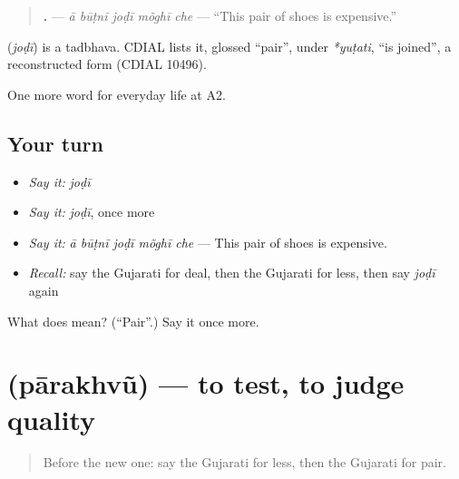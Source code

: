 \begin{quote}
\textbf{    .} — \emph{ā būṭnī joḍī mõghī che} — \textquotedblleft{}This pair of shoes is expensive.\textquotedblright{}
\end{quote}

\begin{cousinweb}
\textbf{} (\emph{joḍī}) is a tadbhava. CDIAL lists it, glossed \textquotedblleft{}pair\textquotedblright{}, under \emph{*yuṭati}, \textquotedblleft{}is joined\textquotedblright{}, a reconstructed form (CDIAL 10496).
\end{cousinweb}

\begin{grammarlens}[title={What you've built}]
One more word for everyday life at A2.
\end{grammarlens}

\subsection*{Your turn}
\begin{itemize}
\raggedright
  \item \emph{Say it:} \emph{joḍī}
  \item \emph{Say it:} \emph{joḍī}, once more
  \item \emph{Say it:} \emph{ā būṭnī joḍī mõghī che} — This pair of shoes is expensive.
  \item \emph{Recall:} say the Gujarati for deal, then the Gujarati for less, then say \emph{joḍī} again
\end{itemize}

\begin{tcolorbox}[breakable,colback=teal!4,colframe=teal!35!black,title={Before you move on}]
What does  mean? (\textquotedblleft{}Pair\textquotedblright{}.) Say it once more.
\end{tcolorbox}
\section[\texorpdfstring{\gu{પારખવું} (pārakhvũ)}{પારખવું (pārakhvũ)}]{ (pārakhvũ) — to test, to judge quality}

\label{lesson:GU-C185-parakhvu}



\begin{quote}
Before the new one: say the Gujarati for less, then the Gujarati for pair.
\end{quote}

